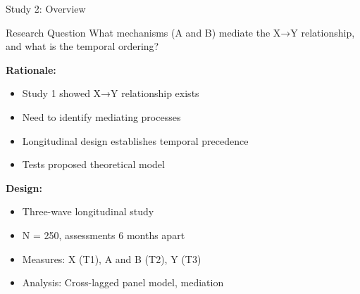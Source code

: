 \documentclass[aspectratio=169,12pt]{beamer}
\begin{document}
\begin{frame}{Study 2: Overview}
  \begin{exampleblock}{Research Question}
    What mechanisms (A and B) mediate the X→Y relationship, and what is the temporal ordering?
  \end{exampleblock}
  
  \vspace{0.5cm}
  
  \textbf{Rationale:}
  \begin{itemize}
    \item Study 1 showed X→Y relationship exists
    \item Need to identify mediating processes
    \item Longitudinal design establishes temporal precedence
    \item Tests proposed theoretical model
  \end{itemize}
  
  \vspace{0.5cm}
  
  \textbf{Design:}
  \begin{itemize}
    \item Three-wave longitudinal study
    \item N = 250, assessments 6 months apart
    \item Measures: X (T1), A and B (T2), Y (T3)
    \item Analysis: Cross-lagged panel model, mediation
  \end{itemize}
\end{frame}
\end{document}
